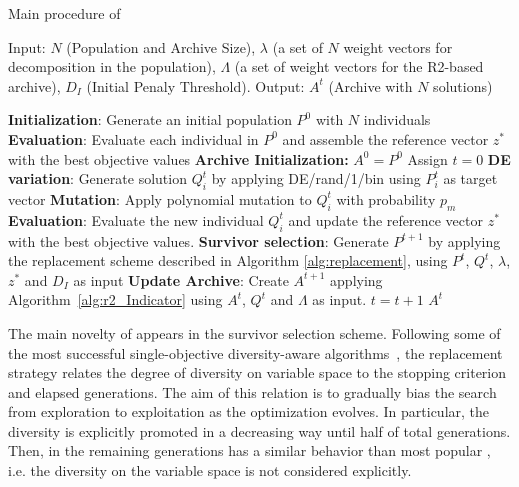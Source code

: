 \begin{algorithm}[!t]
        \caption{Main procedure of \AVSDMOEAD{}}
        \begin{small}
\begin{algorithmic}[1]
				\STATE Input: $N$ (Population and Archive Size), $\lambda$ (a set of $N$ weight vectors for decomposition in the population),
				$\Lambda$ (a set of weight vectors for the R2-based archive), $D_I$ (Initial Penaly Threshold).
        \STATE Output: $A^{t}$ (Archive with $N$ solutions)

        \STATE \textbf{Initialization}: Generate an initial population $P^0$ with $N$ individuals \label{alg_1:1}
        \STATE \textbf{Evaluation}: Evaluate each individual in $P^0$ and assemble the reference vector $z^*$ with the best objective values \label{alg_1:3}
				\STATE \textbf{Archive Initialization:} $A^0 = P^0$
        \STATE Assign $t=0$ \label{alg_1:4}
         \label{alg_1:5}
            \label{alg_1:6}
               \STATE \textbf{DE variation}: Generate solution $Q^t_{i}$ by applying DE/rand/1/bin using $P_{i}^t$ as target vector \label{alg_1:8}
							 \STATE \textbf{Mutation}: Apply polynomial mutation to $Q^t_{i}$ with probability $p_m$
               \STATE \textbf{Evaluation}: Evaluate the new individual $Q^t_{i}$ and update the reference vector $z^*$ with the best objective values. \label{alg_1:9}
           \ENDFOR \label{alg_1:10}
           \STATE \textbf{Survivor selection}: Generate $P^{t+1}$ by applying the replacement scheme described in  Algorithm \ref{alg:replacement}, using $P^t$, $Q^t$, $\lambda$, $z^*$ and $D_I$ as input \label{alg_1:11}
	   \STATE \textbf{Update Archive}: Create $A^{t+1}$ applying Algorithm~\ref{alg:r2_Indicator} using $A^{t}$, $Q^t$ and $\Lambda$ as input. \label{alg_1:11bis}
           \STATE $t=t+1$ \label{alg_1:12}
        \ENDWHILE \label{alg_1:13}
        \RETURN $A^{t}$ 
        \end{algorithmic}
        \end{small}
\label{alg:vsd-moead}
\end{algorithm}


The main novelty of \AVSDMOEAD{} appears in the  survivor selection scheme.
%
Following some of the most successful single-objective diversity-aware algorithms~\cite{segura2016improving}, the 
replacement strategy relates the degree of diversity on variable space to the stopping criterion
and elapsed generations.
%
The aim of this relation is to gradually bias the search from exploration to exploitation as the
optimization evolves.
%
In particular, the diversity is explicitly promoted in a decreasing way until half of total generations. 
%
Then, in the remaining generations \AVSDMOEAD{} has a similar behavior than most popular
\MOEAS{}, i.e. the diversity on the variable space is not considered explicitly.

